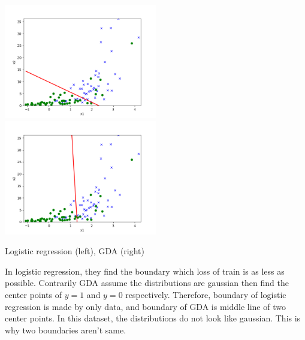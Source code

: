 \begin{answer}

\includegraphics[width=0.5\textwidth]{linearclass/logreg_plot_1_valid.png}
\includegraphics[width=0.5\textwidth]{linearclass/gda_plot_1_valid.png}

Logistic regression (left), GDA (right)

In logistic regression, they find the boundary which loss of train is as less as possible. Contrarily GDA assume the distributions are gaussian then find the center points of $y=1$ and $y=0$ respectively. Therefore, boundary of logistic regression is made by only data, and boundary of GDA is middle line of two center points. In this dataset, the distributions do not look like gaussian. This is why two boundaries aren't same.

\end{answer}
